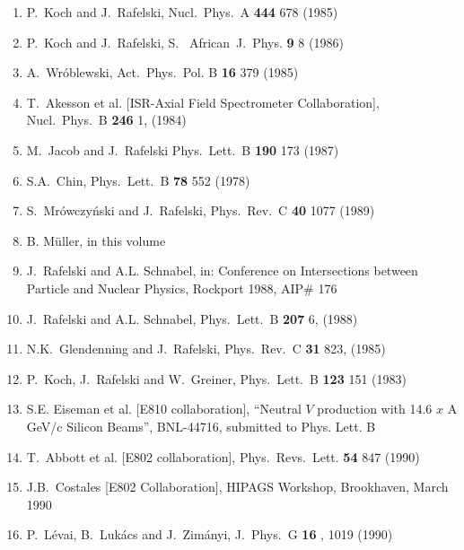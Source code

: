 \begin{mdframed}[linecolor=gray,roundcorner=12pt,backgroundcolor=Dandelion!15,linewidth=1pt,leftmargin=0cm,rightmargin=0cm,topline=true,bottomline=true,skipabove=12pt]
{\begin{enumerate}
\item  P.~Koch and J.~Rafelski, Nucl.\ Phys.\ A {\bf 444} 678  (1985) 

\item  P.~Koch and J.~Rafelski, S. ~African~J.~Phys. {\bf 9} 8  (1986)

\item  A.~Wr\'oblewski, Act.\ Phys.\ Pol. B {\bf 16} 379  (1985)

\item  T.~Akesson et al. [ISR-Axial Field Spectrometer Collaboration],
Nucl.\ Phys.\ B {\bf 246} 1, (1984)

\item  M.~Jacob and J.~Rafelski Phys.\ Lett.\ B {\bf 190} 173  (1987)

\item S.A.~Chin, Phys.\ Lett.\ B {\bf 78} 552  (1978)

\item S.~Mr\'owczy\'nski and J.~Rafelski, Phys.\ Rev.\ C {\bf 40} 1077  (1989)

\item  B. M\"uller, in this volume

\item J.~Rafelski and A.L. Schnabel, in: Conference on Intersections
between Particle and Nuclear Physics, Rockport 1988, AIP\# 176 

\item J.~Rafelski and A.L. Schnabel, Phys.\ Lett.\ B {\bf 207} 6, (1988)

\item N.K.~Glendenning and J.~Rafelski, Phys.\ Rev.\ C {\bf 31} 823, (1985)

\item P.~Koch, J.~Rafelski and W.~Greiner, Phys.\ Lett.\ B {\bf 123} 151  (1983)

\item  S.E. Eiseman et al. [E810 collaboration], ``Neutral $V$
production with 14.6 $x$ A GeV/c Silicon Beams'', BNL-44716, submitted to
Phys. Lett. B

\item  T.~Abbott et al. [E802 collaboration], Phys.~Revs.~Lett. {\bf 54} 847  (1990)
 
\item  J.B.~Costales [E802 Collaboration], HIPAGS Workshop,
Brookhaven, March 1990

\item  P.~L\'evai, B.~Luk\'acs and J.~Zim\'anyi, J.~Phys.~G {\bf 16} , 1019  (1990)


\end{enumerate}}
\end{mdframed}
